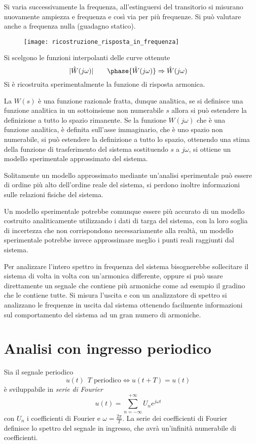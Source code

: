 Si varia successivamente la frequenza, all'estinguersi del transitorio si
misurano nuovamente ampiezza e frequenza e così via per più frequenze.
Si può valutare anche a frequenza nulla (guadagno statico).
\begin{figure}[h]
 \centering
 \texttt{[image: ricostruzione\_risposta\_in\_frequenza]}
\end{figure}

Si scelgono le funzioni interpolanti delle curve ottenute
$$
|\hat{W}(j\omega)| \qquad \phase{\hat{W}(j\omega)} \Rightarrow \hat{W}(j\omega)
$$
Si è ricostruita sperimentalmente la funzione di risposta armonica.

La $W(s)$ è una funzione razionale fratta, dunque analitica, se si definisce
una funzione analitica in un sottoinsieme non numerabile $s$ allora si può
estendere la definizione a tutto lo spazio rimanente.
Se la funzione $W(j\omega)$ che è una funzione analitica, è definita sull'asse
immaginario, che è uno spazio non numerabile, si può estendere la definizione a
tutto lo spazio, ottenendo una stima della funzione di trasferimento del
sistema sostituendo $s$ a $j\omega$, si ottiene un modello sperimentale
approssimato del sistema.

Solitamente un modello approssimato mediante un'analisi sperimentale può
essere di ordine più alto dell'ordine reale del sistema, si perdono inoltre
informazioni sulle relazioni fisiche del sistema.

Un modello sperimentale potrebbe comunque essere più accurato di un modello
costruito analiticamente utilizzando i dati di targa del sistema, con la loro
soglia di incertezza che non corrispondono necessariamente alla realtà, un
modello sperimentale potrebbe invece approssimare meglio i punti reali
raggiunti dal sistema.

Per analizzare l'intero spettro in frequenza del sistema bisognerebbe
sollecitare il sistema di volta in volta con un'armonica differente, oppure
si può usare direttamente un segnale che contiene più armoniche come ad esempio
il gradino che le contiene tutte.
Si misura l'uscita e con un analizzatore di spettro si analizzano le frequenze
in uscita dal sistema ottenendo facilmente informazioni sul comportamento del
sistema ad un gran numero di armoniche.

\section{Analisi con ingresso periodico}
Sia il segnale periodico
$$
u(t)\ \ T\text{ periodico} \Leftrightarrow u(t+T) = u(t)
$$
è sviluppabile in \textit{serie di Fourier}
$$
u(t) = \sum_{n=-\infty}^{+\infty} U_n e^{j\omega t}
$$
con $U_n$ i coefficienti di Fourier e $\omega = \frac{2\pi}{T}$.
La serie dei coefficienti di Fourier definisce lo spettro del segnale in
ingresso, che avrà un'infinità numerabile di coefficienti.

